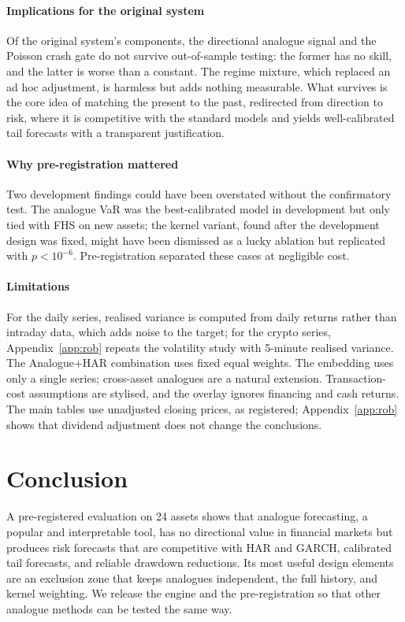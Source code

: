\paragraph{Implications for the original system} Of the original system's components, the
directional analogue signal and the Poisson crash gate do not survive out-of-sample testing: the
former has no skill, and the latter is worse than a constant. The regime mixture, which replaced
an ad hoc adjustment, is harmless but adds nothing measurable. What survives is the core idea of
matching the present to the past, redirected from direction to risk, where it is competitive with
the standard models and yields well-calibrated tail forecasts with a transparent justification.

\paragraph{Why pre-registration mattered} Two development findings could have been overstated
without the confirmatory test. The analogue VaR was the best-calibrated model in development but
only tied with FHS on new assets; the kernel variant, found after the development design was
fixed, might have been dismissed as a lucky ablation but replicated with $p<10^{-6}$.
Pre-registration separated these cases at negligible cost.

\paragraph{Limitations} For the daily series, realised variance is computed from daily returns
rather than intraday data, which adds noise to the target; for the crypto series,
Appendix~\ref{app:rob} repeats the volatility study with 5-minute realised variance. The Analogue+HAR combination uses fixed
equal weights. The embedding uses only a single series; cross-asset analogues are a natural
extension. Transaction-cost assumptions are stylised, and the overlay ignores financing and cash
returns. The main tables use unadjusted closing prices, as registered; Appendix~\ref{app:rob} shows
that dividend adjustment does not change the conclusions.

\section{Conclusion}
A pre-registered evaluation on 24 assets shows that analogue forecasting, a popular and
interpretable tool, has no directional value in financial markets but produces risk forecasts
that are competitive with HAR and GARCH, calibrated tail forecasts, and reliable drawdown
reductions. Its most useful design elements are an exclusion zone that keeps analogues
independent, the full history, and kernel weighting. We release the engine and the
pre-registration so that other analogue methods can be tested the same way.

